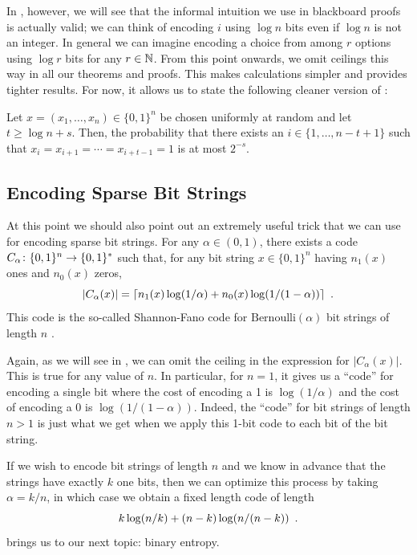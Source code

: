 \documentclass{patmorin}
\newenvironment{customthm}[1]
  {\renewcommand\theinnercustomthm{#1}\innercustomthm}
  {\endinnercustomthm}
\begin{document}
In , however, we will see that the informal intuition
we use in blackboard proofs is actually valid; we can think of
encoding $i$ using $\log n$ bits even if $\log n$ is not an integer.
In general we can imagine encoding a choice from among $r$ options
using $\log r$ bits for any $r\in\mathbb{N}$.  From this point onwards, we
omit ceilings this way in all our theorems and proofs. This makes
calculations simpler and provides tighter results.  For now, it allows
us to state the following cleaner version of :

\begin{customthm}{\ref{thm:runs-i}b}
  Let $x=(x_1,\ldots,x_n)\in\{0,1\}^n$ be chosen uniformly at random
  and let $t \ge \log n + s$. Then, the probability that there exists
  an $i\in\{1,\ldots,n-t+1\}$ such that
  $x_i=x_{i+1}=\cdots=x_{i+t-1}=1$ is at most $2^{-s}$.
\end{customthm}

\subsection{Encoding Sparse Bit Strings}

At this point we should also point out an extremely useful trick that
we can use for encoding sparse bit strings. For any $\alpha\in(0,1)$,
there exists a code $C_\alpha\colon \{0,1\}^n\rightarrow \{0,1\}^*$
such that, for any bit string $x\in\{0,1\}^n$ having $n_1(x)$ ones and
$n_0(x)$ zeros,
\begin{equation}
  |C_\alpha(x)| = \lceil n_1(x)\log(1/\alpha) + n_0(x)\log(1/(1-\alpha)) \rceil \enspace .
  \eqlabel{sparse-bitstring-i}
\end{equation}
This code is the so-called Shannon-Fano code for
$\mathrm{Bernoulli}(\alpha)$ bit strings of length $n$
\cite{fano:transmission,shannon:mathematical}.

Again, as we will see in , we can omit the ceiling in
the expression for $|C_\alpha(x)|$.  This is true for any value of
$n$. In particular, for $n=1$, it gives us a ``code'' for encoding a
single bit where the cost of encoding a 1 is $\log(1/\alpha)$ and the
cost of encoding a 0 is $\log(1/(1-\alpha))$.  Indeed, the ``code''
for bit strings of length $n>1$ is just what we get when we apply this
1-bit code to each bit of the bit string.

If we wish to encode bit strings of length $n$ and we know in advance
that the strings have exactly $k$ one bits, then we can optimize this
process by taking $\alpha=k/n$, in which case we obtain a fixed length
code of length
\begin{equation}
    k\log (n/k) + (n-k)\log(n/(n-k))  \eqlabel{sparse-bitstring-ii} \enspace .
\end{equation}
 brings us to our next topic: binary entropy.
\end{document}
